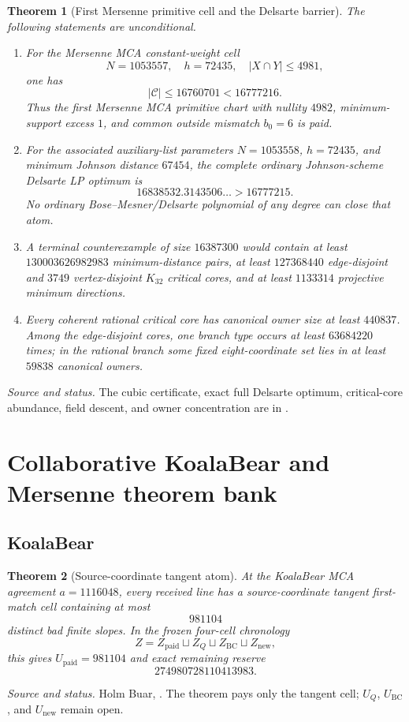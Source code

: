 \documentclass[11pt,a4paper]{amsart}
\numberwithin{equation}{section}
\newtheorem{theorem}{Theorem}[section]
\theoremstyle{remark}
\newcommand{\abs}[1]{\lvert#1\rvert}
\newcommand{\source}[1]{\par\smallskip\noindent\textit{Source and status.} #1\par}
\begin{document}
\begin{theorem}[First Mersenne primitive cell and the Delsarte barrier]\label{thm:m31-companion}
The following statements are unconditional.
\begin{enumerate}[label=\textup{(\roman*)},leftmargin=*]
\item For the Mersenne MCA constant-weight cell
\[
 N=1053557,
 \quad h=72435,
 \quad \abs{X\cap Y}\le4981,
\]
one has
\[
 \abs{\mathcal C}\le16760701<16777216.
\]
Thus the first Mersenne MCA primitive chart with nullity $4982$, minimum-support excess $1$, and common outside mismatch $b_0=6$ is paid.
\item For the associated auxiliary-list parameters $N=1053558$, $h=72435$, and minimum Johnson distance $67454$, the complete ordinary Johnson-scheme Delsarte LP optimum is
\[
 16838532.3143506\ldots>16777215.
\]
No ordinary Bose--Mesner/Delsarte polynomial of any degree can close that atom.
\item A terminal counterexample of size $16387300$ would contain at least $130003626982983$ minimum-distance pairs, at least $127368440$ edge-disjoint and $3749$ vertex-disjoint $K_{32}$ critical cores, and at least $1133314$ projective minimum directions.
\item Every coherent rational critical core has canonical owner size at least $440837$.  Among the edge-disjoint cores, one branch type occurs at least $63684220$ times; in the rational branch some fixed eight-coordinate set lies in at least $59838$ canonical owners.
\end{enumerate}
\end{theorem}
\source{The cubic certificate, exact full Delsarte optimum, critical-core abundance, field descent, and owner concentration are in \cite{ChoComp26}.}

\section{Collaborative KoalaBear and Mersenne theorem bank}

\subsection*{KoalaBear}

\begin{theorem}[Source-coordinate tangent atom]\label{thm:kb-tangent}
At the KoalaBear MCA agreement $a=1116048$, every received line has a source-coordinate tangent first-match cell containing at most
\[
 \boxed{981104}
\]
distinct bad finite slopes.  In the frozen four-cell chronology
\[
 Z=Z_{\mathrm{paid}}\sqcup Z_Q\sqcup Z_{\mathrm{BC}}\sqcup Z_{\mathrm{new}},
\]
this gives $U_{\mathrm{paid}}=981104$ and exact remaining reserve
\[
 274980728110413983.
\]
\end{theorem}
\source{Holm Buar, \cite{BuarKBTangent26}.  The theorem pays only the tangent cell; $U_Q$, $U_{\mathrm{BC}}$, and $U_{\mathrm{new}}$ remain open.}
\end{document}
